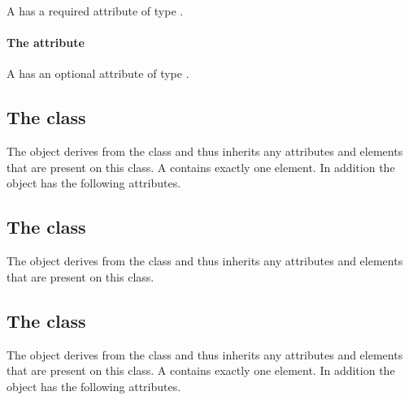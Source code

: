 A \RenderEllipse has a required attribute  of type
\RelAbsVector.

\paragraph{The \fixttspace{} attribute}

A \RenderEllipse has an optional attribute  of type
\RelAbsVector.

\subsection{The  class}
\label{globalrenderinformation-class}


The \GlobalRenderInformation object derives from the
 class and thus inherits any attributes and
elements that are present on this class.
A \GlobalRenderInformation contains exactly one 
element.
In addition the \GlobalRenderInformation object has the following
attributes.



\subsection{The  class}
\label{globalstyle-class}


The \GlobalStyle object derives from the  class and thus
inherits any attributes and elements that are present on this class.
\subsection{The  class}
\label{gradientbase-class}


The \GradientBase object derives from the  class and thus
inherits any attributes and elements that are present on this class.
A \GradientBase contains exactly one  element.
In addition the \GradientBase object has the following attributes.

